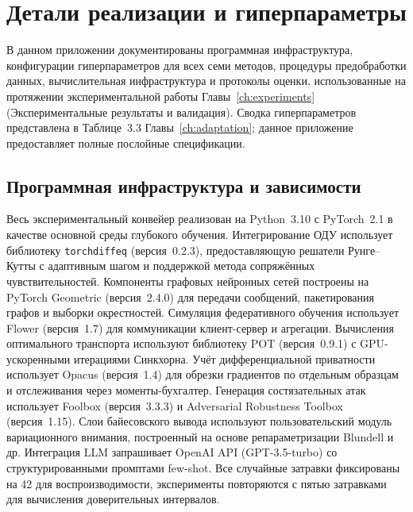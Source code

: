 
\chapter{Детали реализации и гиперпараметры}
\label{app:implementation}

В данном приложении документированы программная инфраструктура, конфигурации гиперпараметров для всех семи методов, процедуры предобработки данных, вычислительная инфраструктура и протоколы оценки, использованные на протяжении экспериментальной работы Главы~\ref{ch:experiments} (Экспериментальные результаты и валидация). Сводка гиперпараметров представлена в Таблице~3.3 Главы~\ref{ch:adaptation}; данное приложение предоставляет полные послойные спецификации.


\section{Программная инфраструктура и зависимости}
\label{app:software}

Весь экспериментальный конвейер реализован на Python~3.10 с PyTorch~2.1 в качестве основной среды глубокого обучения. Интегрирование ОДУ использует библиотеку \texttt{torchdiffeq} (версия~0.2.3), предоставляющую решатели Рунге--Кутты с адаптивным шагом и поддержкой метода сопряжённых чувствительностей. Компоненты графовых нейронных сетей построены на PyTorch Geometric (версия~2.4.0) для передачи сообщений, пакетирования графов и выборки окрестностей. Симуляция федеративного обучения использует Flower (версия~1.7) для коммуникации клиент-сервер и агрегации. Вычисления оптимального транспорта используют библиотеку POT (версия~0.9.1) с GPU-ускоренными итерациями Синкхорна. Учёт дифференциальной приватности использует Opacus (версия~1.4) для обрезки градиентов по отдельным образцам и отслеживания через моменты-бухгалтер. Генерация состязательных атак использует Foolbox (версия~3.3.3) и Adversarial Robustness Toolbox (версия~1.15). Слои байесовского вывода используют пользовательский модуль вариационного внимания, построенный на основе репараметризации Blundell и др. Интеграция LLM запрашивает OpenAI API (GPT-3.5-turbo) со структурированными промптами few-shot. Все случайные затравки фиксированы на 42 для воспроизводимости, эксперименты повторяются с пятью затравками для вычисления доверительных интервалов.


